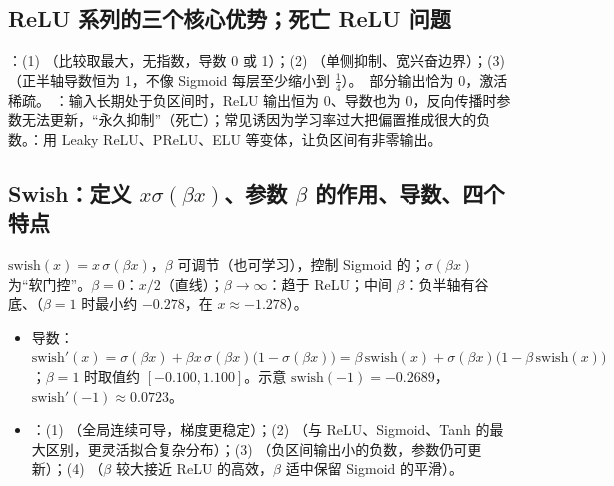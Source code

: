 \subsection{ReLU 系列的三个核心优势；死亡 ReLU 问题}
：(1) （比较取最大，无指数，导数 0 或 1）；(2) （单侧抑制、宽兴奋边界）；(3) （正半轴导数恒为 1，不像 Sigmoid 每层至少缩小到 $\frac14$）。\tagext\ 部分输出恰为 0，激活稀疏。
：输入长期处于负区间时，ReLU 输出恒为 0、导数也为 0，反向传播时参数无法更新，“永久抑制”（死亡）；常见诱因为学习率过大把偏置推成很大的负数。：用 Leaky ReLU、PReLU、ELU 等变体，让负区间有非零输出。

\subsection{Swish：定义 \texorpdfstring{$x\sigma(\beta x)$}{x sigma(beta x)}、参数 \texorpdfstring{$\beta$}{beta} 的作用、导数、四个特点}
$\mathrm{swish}(x)=x\,\sigma(\beta x)$，$\beta$ 可调节（也可学习），控制 Sigmoid 的；$\sigma(\beta x)$ 为“软门控”。$\beta=0$：$x/2$（直线）；$\beta\to\infty$：趋于 ReLU；中间 $\beta$：负半轴有谷底、（$\beta=1$ 时最小约 $-0.278$，在 $x\approx-1.278$）。
\begin{itemize}
\item 导数：$\mathrm{swish}'(x)=\sigma(\beta x)+\beta x\,\sigma(\beta x)\big(1-\sigma(\beta x)\big)=\beta\,\mathrm{swish}(x)+\sigma(\beta x)\big(1-\beta\,\mathrm{swish}(x)\big)$；$\beta=1$ 时取值约 $[-0.100,1.100]$。示意 $\mathrm{swish}(-1)=-0.2689$，$\mathrm{swish}'(-1)\approx0.0723$。
\item {}：(1) （全局连续可导，梯度更稳定）；(2) （与 ReLU、Sigmoid、Tanh 的最大区别，更灵活拟合复杂分布）；(3) （负区间输出小的负数，参数仍可更新）；(4) （$\beta$ 较大接近 ReLU 的高效，$\beta$ 适中保留 Sigmoid 的平滑）。
\end{itemize}

